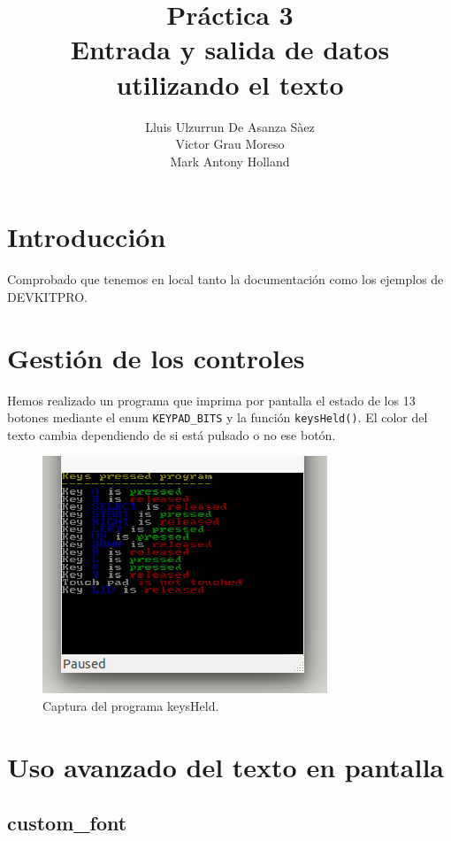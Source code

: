 \documentclass[12pt,english]{article}
\title{Práctica 3\\ Entrada y salida de datos utilizando el texto}
\author{Lluis Ulzurrun De Asanza Sàez\\Victor Grau Moreso \\Mark Antony Holland}
\date{}
\begin{document}
    \maketitle

    \tableofcontents

    \newpage
    
    \section{Introducción}

    Comprobado que tenemos en local tanto la documentación como los ejemplos de DEVKITPRO.

    \section{Gestión de los controles}

    Hemos realizado un programa que imprima por pantalla el estado de los 13 botones mediante el enum \texttt{KEYPAD\_BITS} y la función \texttt{keysHeld()}. El color del texto cambia dependiendo de si está pulsado o no ese botón.
    
    \begin{figure}[H] 
    \centering
    \includegraphics[scale=0.5]{p3Media/keysHeld}
    \caption{Captura del programa keysHeld.}
    \end{figure}

    \newpage

    \section{Uso avanzado del texto en pantalla}

    \subsection{custom\_font}
\end{document}
